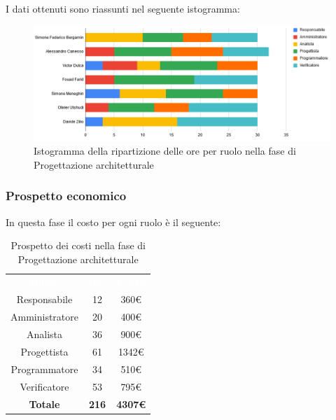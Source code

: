 I dati ottenuti sono riassunti nel seguente istogramma:
\begin{figure}[H]
\centering
\includegraphics[scale=0.60]{img/grafici/tabella_fase_prog_architetturale.png}
\caption{Istogramma della ripartizione delle ore per ruolo nella fase di Progettazione architetturale}
\end{figure}

\subsubsection{Prospetto economico}
In questa fase il costo per ogni ruolo è il seguente:

\begin{table}[H]
\centering\renewcommand{\arraystretch}{1.5}
\caption{Prospetto dei costi nella fase di Progettazione architetturale}
\vspace{0.2cm}
\begin{tabular}{ c | c | c  }
\rowcolor{redafk}
\textcolor{white}{\textbf{Ruolo}} & \textcolor{white}{\textbf{Ore}} & 
\textcolor{white}{\textbf{Costo}}  \\
Responsabile & 12 & 360€ \\
Amministratore & 20 & 400€ \\
Analista & 36 & 900€ \\
Progettista	& 61 & 1342€ \\
Programmatore & 34 & 510€  \\
Verificatore & 53 & 795€  \\
\rowcolor{lastrowcolor}
\textbf{Totale} & \textbf{216} & \textbf{4307€}  \\
\end{tabular}
\end{table}

